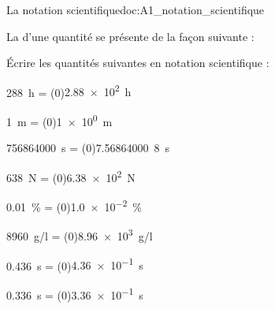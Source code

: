 \begin{doc}{La notation scientifique}{doc:A1_notation_scientifique}
  \begin{importants}
  La  d'une quantité se présente de la façon suivante :
  \begin{center}
    \hspace{5pt}
    \qq{}
  \end{center}
  \vspace*{-32pt}
  \end{importants}
\end{doc}

\numeroQuestion Écrire les quantités suivantes en notation scientifique :
\vspace*{-8pt}
\begin{listePoints}[2]
  \item \qty{288}{\hour}      = \texteTrou(0){\qty{2,88e2}{\hour}\\}
  \item \qty{1}{\m}           = \texteTrou(0){\qty{1e0}{\m}\\}
  \item \qty{756 864 000}{\s} = \texteTrou(0){\qty{7,56 864 000}{8\s}\\}
  \item \qty{638}{\newton}    = \texteTrou(0){\qty{6,38e2}{\newton}}
  \item \qty{0,01}{\percent}  = \texteTrou(0){\qty{1,0e-2}{\percent}\\}
  \item \qty{8960}{\g/\l}     = \texteTrou(0){\qty{8,96e3}{\g/\l}\\}
  \item \qty{0,436}{\s}       = \texteTrou(0){\qty{4,36e-1}{\s}\\}
  \item \qty{0,336}{\s}       = \texteTrou(0){\qty{3,36e-1}{\s}}
\end{listePoints}
\vspace*{-16pt}

